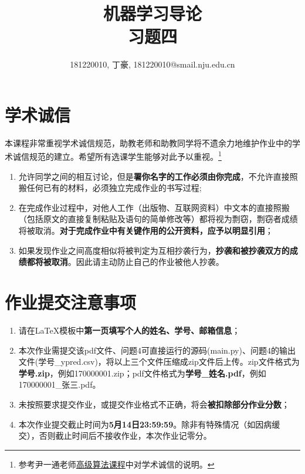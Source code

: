 \documentclass[a4paper,UTF8]{article}
\theoremstyle{definition}
\begin{document}
\title{机器学习导论\\习题四}
\author{181220010, 丁豪, 181220010@smail.nju.edu.cn}
\maketitle


\section*{学术诚信}

本课程非常重视学术诚信规范，助教老师和助教同学将不遗余力地维护作业中的学术诚信规范的建立。希望所有选课学生能够对此予以重视。\footnote{参考尹一通老师\href{http://tcs.nju.edu.cn/wiki/}{高级算法课程}中对学术诚信的说明。}

\begin{tcolorbox}
	\begin{enumerate}
		\item[(1)] 允许同学之间的相互讨论，但是{\color{red}\textbf{署你名字的工作必须由你完成}}，不允许直接照搬任何已有的材料，必须独立完成作业的书写过程;
		\item[(2)] 在完成作业过程中，对他人工作（出版物、互联网资料）中文本的直接照搬（包括原文的直接复制粘贴及语句的简单修改等）都将视为剽窃，剽窃者成绩将被取消。{\color{red}\textbf{对于完成作业中有关键作用的公开资料，应予以明显引用}}；
		\item[(3)] 如果发现作业之间高度相似将被判定为互相抄袭行为，{\color{red}\textbf{抄袭和被抄袭双方的成绩都将被取消}}。因此请主动防止自己的作业被他人抄袭。
	\end{enumerate}
\end{tcolorbox}

\section*{作业提交注意事项}
\begin{tcolorbox}
	\begin{enumerate}
		\item[(1)] 请在LaTeX模板中{\color{red}\textbf{第一页填写个人的姓名、学号、邮箱信息}}；
		\item[(2)] 本次作业需提交该pdf文件、问题4可直接运行的源码(main.py)、问题4的输出文件(学号\_ypred.csv)，将以上三个文件压缩成zip文件后上传。zip文件格式为{\color{red}\textbf{学号.zip}}，例如170000001.zip；pdf文件格式为{\color{red}\textbf{学号\_姓名.pdf}}，例如170000001\_张三.pdf。
		\item[(3)] 未按照要求提交作业，或提交作业格式不正确，将会{\color{red}\textbf{被扣除部分作业分数}}；
		\item[(4)] 本次作业提交截止时间为{\color{red}\textbf{5月14日23:59:59}}。除非有特殊情况（如因病缓交），否则截止时间后不接收作业，本次作业记零分。
	\end{enumerate}
\end{tcolorbox}
\end{document}
